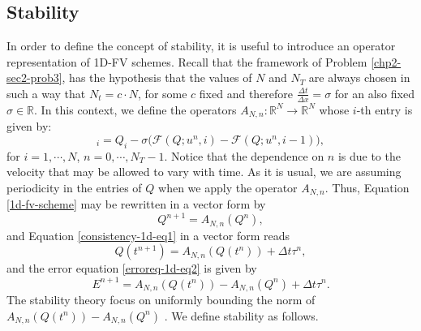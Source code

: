 \subsection{Stability}
In order to define the concept of stability, it is useful to introduce an operator
representation of 1D-FV schemes.
Recall that the framework of Problem \ref{chp2-sec2-prob3},
has the hypothesis that the values of $N$ and $N_T$ are always chosen in such a way
that $N_t = c \cdot N $, for some $c$ fixed and therefore $\frac{\Delta t}{\Delta x} = \sigma$
for an also fixed $\sigma \in \mathbb{R}$.
In this context, we define the operators
$A_{N,n}: \mathbb{R}^N \to \mathbb{R}^N$ whose $i$-th entry is given by:
\begin{equation}
	[A_{N,n}(Q)]_i = Q_i -\sigma \bigg( \mathcal{F}(Q;u^n,i) - \mathcal{F}(Q;u^n,i-1) \bigg),
\end{equation}
for $i=1, \cdots, N$, $n=0, \cdots, N_T-1$.
Notice that the dependence on $n$ is due to the velocity that may be allowed
to vary with time.
As it is usual, we are assuming periodicity in the entries of $Q$ when 
we apply the operator $A_{N,n}$.
Thus, Equation \eqref{1d-fv-scheme} may be rewritten in a vector form by
\begin{equation*}
	Q^{n+1} = A_{N,n}(Q^n),
\end{equation*}
and Equation \eqref{consistency-1d-eq1} in a vector form reads
\begin{equation*}
	Q(t^{n+1}) = A_{N,n}(Q(t^n)) + \Delta t \tau^n,
\end{equation*}
and the error equation \eqref{erroreq-1d-eq2} is given by
\begin{equation}
	\label{erroreq-1d-eq3}
	E^{n+1} = A_{N,n}(Q(t^n)) - A_{N,n}(Q^n) +  \Delta t \tau^n.
\end{equation}
The stability theory focus on uniformly bounding the norm of $A_{N,n}(Q(t^n)) - A_{N,n}(Q^n)$ \citep{leveque:2002}.
We define stability as follows.


